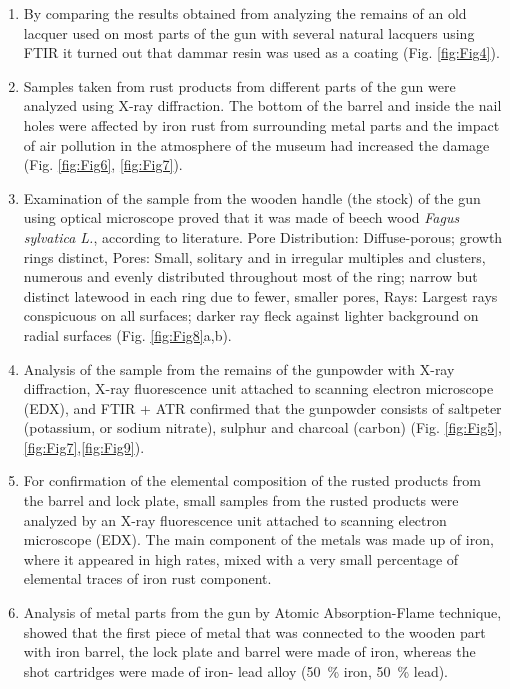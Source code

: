 \begin{enumerate}
	\item By comparing the results obtained from analyzing the remains of an old lacquer used on most parts of the gun with several natural lacquers using FTIR it turned out that dammar resin was used as a coating (Fig. \ref{fig:Fig4}). 
	\item Samples taken from rust products from different parts of the gun were analyzed using X-ray diffraction. The bottom of the barrel and inside the nail holes were affected by iron rust from surrounding metal parts and the impact of air pollution in the atmosphere of the museum had increased the damage (Fig. \ref{fig:Fig6}, \ref{fig:Fig7}).  
	\item Examination of the sample from the wooden handle (the stock) of the gun using optical microscope proved that it was made of beech wood \textit{Fagus sylvatica L.}, according to literature. Pore Distribution: Diffuse-porous; growth rings distinct, Pores: Small, solitary and in irregular multiples and clusters, numerous and evenly distributed throughout most of the ring; narrow but distinct latewood in each ring due to fewer, smaller pores, Rays: Largest rays conspicuous on all surfaces; darker ray fleck against lighter background on radial surfaces \parencite[117--118]{Hoadley_1990}(Fig. \ref{fig:Fig8}a,b).
	\item Analysis of the sample from the remains of the gunpowder with X-ray diffraction, X-ray fluorescence unit attached to scanning electron microscope (EDX), and FTIR + ATR confirmed that the gunpowder consists of saltpeter (potassium, or sodium nitrate), sulphur and charcoal (carbon) \parencites[3]{Driel_2000}[3--5]{Alexander_2012}[5]{Richard_2011} (Fig. \ref{fig:Fig5},\ref{fig:Fig7},\ref{fig:Fig9}).
	\item  For confirmation of the elemental composition of the rusted products from the barrel and lock plate, small samples from the rusted products were analyzed by an X-ray fluorescence unit attached to scanning electron microscope (EDX). The main component of the metals was made up of iron, where it appeared in high rates, mixed with a very small percentage of elemental traces of iron rust component.
	\item Analysis of metal parts from the gun by Atomic Absorption-Flame technique, showed that the first piece of metal that was connected to the wooden part with iron barrel, the lock plate and barrel were made of iron, whereas the shot cartridges were made of iron- lead alloy (\SI{50}{\percent} iron, \SI{50}{\percent} lead). 
\end{enumerate}

